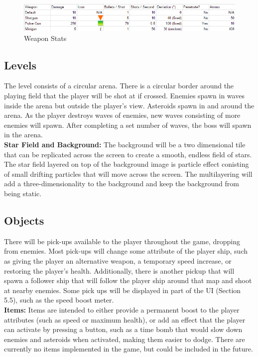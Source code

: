 \documentclass[12pt]{article}       %
\def\hs{\hspace{15pt}}
\begin{document}
\begin{figure} [H]
\includegraphics[width=6in]{stats.png}
\centering
\caption{Weapon Stats} \label{stats}
\end{figure}

\subsection{Levels} %

	\hs {\bf Level design:} The level consists of a circular arena. There is a circular border around the playing field that the player will be shot at if crossed. Enemies spawn in waves inside the arena but outside the player's view. Asteroids spawn in and around the arena. As the player destroys waves of enemies, new waves consisting of more enemies will spawn. After completing a set number of waves, the boss will spawn in the arena. \\

	{\bf Star Field and Background:} The background will be a two dimensional tile that can be replicated across the screen to create a smooth, endless field of stars. The star field layered on top of the background image is particle effect conisting of small drifting particles that will move across the screen. The multilayering will add a three-dimensionality to the background and keep the background from being static. 

\subsection{Objects} %

	\hs {\bf Pick-ups:}  There will be pick-ups available to the player throughout the game, dropping from enemies. Most pick-ups will change some attribute of the player ship, such as giving the player an alternative weapon, a temporary speed increase, or restoring the player's health. Additionally, there is another pickup that will spawn a follower ship that will follow the player ship around that map and shoot at nearby enemies. Some pick ups will be displayed in part of the UI (Section 5.5), such as the speed boost meter. \\

	{\bf  Items:} Items are intended to either provide a permanent boost to the player attributes (such as speed or maximum health), or add an effect that the player can activate by pressing a button, such as a time bomb that would slow down enemies and asteroids when activated, making them easier to dodge. There are currently no items implemented in the game, but could be included in the future. \\
\end{document}
